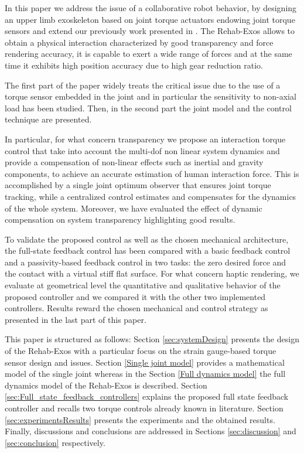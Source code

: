 \documentclass[journal]{IEEEtran}
\begin{document}
\par In this paper we address the issue of a collaborative robot behavior, by designing an upper limb exoskeleton based on joint torque actuators endowing joint torque sensors and extend our previously work presented in \cite{solazzi2014interaction}. 
The Rehab-Exos allows to obtain a physical interaction characterized by good transparency and force rendering accuracy, it is capable to exert a wide range of forces and at the same time it exhibits high position accuracy due to high gear reduction ratio.
\par The first part of the paper widely treats the critical issue due to the use of a torque sensor embedded in the joint and in particular the sensitivity to non-axial load has been studied. Then, in the second part the joint model and the control technique are presented.
\par In particular, for what concern transparency we propose an interaction torque control that take into account the multi-dof non linear system dynamics and provide a compensation of non-linear effects such as inertial and gravity components, to achieve an accurate estimation of human interaction force.
This is accomplished by a single joint optimum observer that ensures joint torque tracking, while a centralized control estimates and compensates for the dynamics of the whole system. Moreover, we have evaluated the effect of dynamic compensation on system transparency highlighting good results.
\par To validate the proposed control as well as the chosen mechanical architecture, the full-state feedback control  has been compared with a basic feedback control and a passivity-based feedback control in two tasks: the zero desired force and the contact with a virtual stiff flat surface. 
For what concern haptic rendering, we evaluate at geometrical level the quantitative and qualitative behavior of the proposed controller and we compared it with the other two implemented controllers.
Results reward the chosen mechanical and control strategy as presented in the last part of this paper.
 
\par This paper is structured as follows: Section \ref{sec:systemDesign} presents the design of the Rehab-Exos with a particular focus on the strain gauge-based torque sensor design and issues. Section \ref{Single joint model} provides a mathematical model of the single joint whereas in the Section \ref{Full dynamics model} the full dynamics model of the Rehab-Exos is described. Section \ref{sec:Full_state_feedback_controllers} explains the proposed full state feedback controller and recalls two torque controls already known in literature. Section \ref{sec:experimentsResults} presents the experiments and the obtained results.
Finally, discussions and conclusions are addressed in Sections \ref{sec:discussion} and \ref{sec:conclusion} respectively.  
\end{document}
